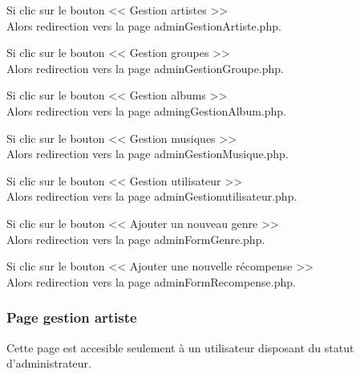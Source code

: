 \begin{paragraphe}

			\begin{paragraphe}
				Si clic sur le bouton << Gestion artistes >> \\
				Alors redirection vers la page adminGestionArtiste.php.
			\end{paragraphe}

			\begin{paragraphe}
				Si clic sur le bouton << Gestion groupes >> \\
				Alors redirection vers la page adminGestionGroupe.php.
			\end{paragraphe}

			\begin{paragraphe}
				Si clic sur le bouton << Gestion albums >> \\
				Alors redirection vers la page admingGestionAlbum.php.
			\end{paragraphe}

			\begin{paragraphe}
				Si clic sur le bouton << Gestion musiques >> \\
				Alors redirection vers la page adminGestionMusique.php.
			\end{paragraphe}

			\begin{paragraphe}
				Si clic sur le bouton << Gestion utilisateur >> \\
				Alors redirection vers la page adminGestionutilisateur.php.
			\end{paragraphe}

			\begin{paragraphe}
				Si clic sur le bouton << Ajouter un nouveau genre >> \\
				Alors redirection vers la page adminFormGenre.php.
			\end{paragraphe}

			\begin{paragraphe}
				Si clic sur le bouton << Ajouter une nouvelle récompense >> \\
				Alors redirection vers la page adminFormRecompense.php.
			\end{paragraphe}

		\subsubsection{Page gestion artiste}

			\begin{paragraphe}
				Cette page est accesible seulement à un utilisateur disposant du statut d'administrateur.
			\end{paragraphe}


\end{paragraphe}

